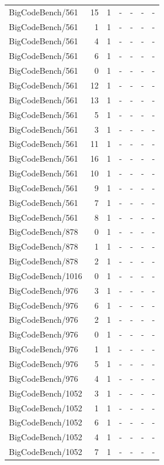 \begin{longtable}{lrrllll}
BigCodeBench/561 & 15 & 1 & - & - & - & - \\
BigCodeBench/561 & 1 & 1 & - & - & - & - \\
BigCodeBench/561 & 4 & 1 & - & - & - & - \\
BigCodeBench/561 & 6 & 1 & - & - & - & - \\
BigCodeBench/561 & 0 & 1 & - & - & - & - \\
BigCodeBench/561 & 12 & 1 & - & - & - & - \\
BigCodeBench/561 & 13 & 1 & - & - & - & - \\
BigCodeBench/561 & 5 & 1 & - & - & - & - \\
BigCodeBench/561 & 3 & 1 & - & - & - & - \\
BigCodeBench/561 & 11 & 1 & - & - & - & - \\
BigCodeBench/561 & 16 & 1 & - & - & - & - \\
BigCodeBench/561 & 10 & 1 & - & - & - & - \\
BigCodeBench/561 & 9 & 1 & - & - & - & - \\
BigCodeBench/561 & 7 & 1 & - & - & - & - \\
BigCodeBench/561 & 8 & 1 & - & - & - & - \\
BigCodeBench/878 & 0 & 1 & - & - & - & - \\
BigCodeBench/878 & 1 & 1 & - & - & - & - \\
BigCodeBench/878 & 2 & 1 & - & - & - & - \\
BigCodeBench/1016 & 0 & 1 & - & - & - & - \\
BigCodeBench/976 & 3 & 1 & - & - & - & - \\
BigCodeBench/976 & 6 & 1 & - & - & - & - \\
BigCodeBench/976 & 2 & 1 & - & - & - & - \\
BigCodeBench/976 & 0 & 1 & - & - & - & - \\
BigCodeBench/976 & 1 & 1 & - & - & - & - \\
BigCodeBench/976 & 5 & 1 & - & - & - & - \\
BigCodeBench/976 & 4 & 1 & - & - & - & - \\
BigCodeBench/1052 & 3 & 1 & - & - & - & - \\
BigCodeBench/1052 & 1 & 1 & - & - & - & - \\
BigCodeBench/1052 & 6 & 1 & - & - & - & - \\
BigCodeBench/1052 & 4 & 1 & - & - & - & - \\
BigCodeBench/1052 & 7 & 1 & - & - & - & - \\

\end{longtable}
